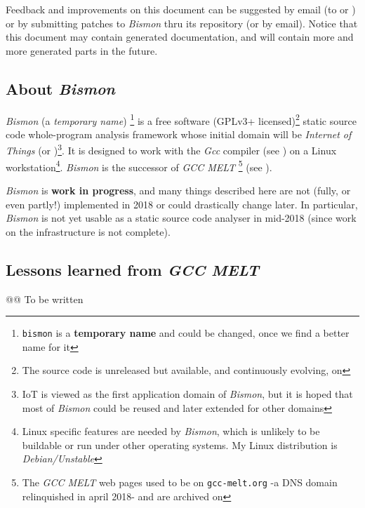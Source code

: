 Feedback and improvements on this document can be suggested by email
(to  or
) or by submitting patches to
\textit{Bismon} thru its  repository
(or by email). Notice that this document may contain generated
documentation, and will contain more and more generated parts in the
future.

\subsection{About \textit{Bismon}}

\textit{Bismon} (a \emph{temporary name}) \footnote{\texttt{bismon} is a \textbf{temporary name}
  and could be changed, once we find a better name for it} is a free
software (GPLv3+ licensed)\footnote{The source code is unreleased but available, and continuously evolving, on } static source code whole-program analysis framework whose
initial domain will be \emph{Internet of Things} (or
)\footnote{IoT is viewed as the first application
  domain of \textit{Bismon}, but it is hoped that most of
  \textit{Bismon} could be reused and later extended for other
  domains}. It is designed to work with the \textit{Gcc} compiler (see
) on a Linux workstation\footnote{Linux specific features are needed by \textit{Bismon}, which is unlikely to be buildable or run under other operating systems. My Linux distribution is \emph{Debian/Unstable}}. \textit{Bismon} is the
successor of \textit{GCC MELT} \footnote{The \textit{GCC MELT} web
  pages used to be on \texttt{gcc-melt.org} -a DNS domain relinquished
  in april 2018- and are archived on
  } (see \cite{Starynkevitch2007Multistage, starynkevitch-DSL2011}).

{\large \textit{Bismon} is \textbf{work in progress}}, and many things
described here are not (fully, or even partly!) implemented in 2018 or
could drastically change later. In particular, \textit{Bismon} is not
yet usable as a static source code analyser in mid-2018 (since work on
the infrastructure is not complete).

\bigskip

\subsection{Lessons learned from \textit{GCC MELT}}

@@ To be written

